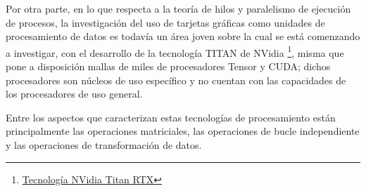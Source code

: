 \documentclass[../main/main.tex]{subfiles}
\begin{document}
  Por otra parte, en lo que respecta a la teoría de hilos y paralelismo de ejecución de procesos, la investigación del uso de tarjetas gráficas como unidades de procesamiento de datos es todavía un área joven sobre la cual se está comenzando a investigar, con el desarrollo de la tecnología TITAN de NVidia \footnote{\href{https://www.nvidia.com/en-us/titan/titan-rtx/}{Tecnología NVidia Titan RTX}}, misma que pone a disposición mallas de miles de procesadores Tensor y CUDA; dichos procesadores son núcleos de uso específico y no cuentan con las capacidades de los procesadores de uso general.

  Entre los aspectos que caracterizan estas tecnologías de procesamiento están principalmente las operaciones matriciales, las operaciones de bucle independiente y las operaciones de transformación de datos.
\end{document}
